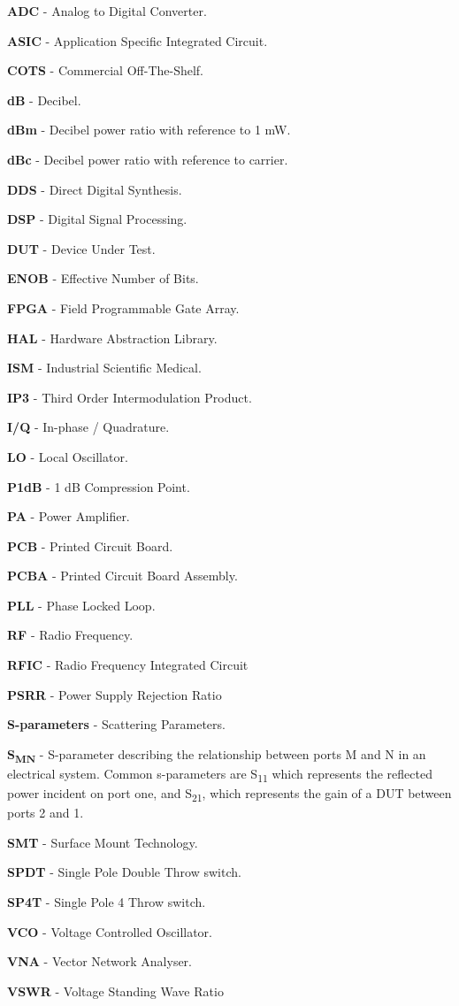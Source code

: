 \textbf{ADC} - Analog to Digital Converter.

\textbf{ASIC} - Application Specific Integrated Circuit.

\textbf{COTS} - Commercial Off-The-Shelf.

\textbf{dB} - Decibel.

\textbf{dBm} - Decibel power ratio with reference to 1 mW.

\textbf{dBc} - Decibel power ratio with reference to carrier.

\textbf{DDS} - Direct Digital Synthesis. 

\textbf{DSP} - Digital Signal Processing.

\textbf{DUT} - Device Under Test. 

\textbf{ENOB} - Effective Number of Bits.

\textbf{FPGA} - Field Programmable Gate Array.

\textbf{HAL} - Hardware Abstraction Library.

\textbf{ISM} - Industrial Scientific Medical.

\textbf{IP3} - Third Order Intermodulation Product.

\textbf{I/Q} - In-phase / Quadrature. 

\textbf{LO} - Local Oscillator. 

\textbf{P1dB} - 1 dB Compression Point. 

\textbf{PA} - Power Amplifier.

\textbf{PCB} - Printed Circuit Board. 

\textbf{PCBA} - Printed Circuit Board Assembly.

\textbf{PLL} - Phase Locked Loop.

\textbf{RF} - Radio Frequency.

\textbf{RFIC} - Radio Frequency Integrated Circuit

\textbf{PSRR} - Power Supply Rejection Ratio

\textbf{S-parameters} - Scattering Parameters.

\textbf{S\textsubscript{MN}} - S-parameter describing the relationship between ports M and N in an electrical system. Common s-parameters are S\textsubscript{11} which represents the reflected power incident on port one, and S\textsubscript{21}, which represents the gain of a DUT between ports 2 and 1. 

\textbf{SMT} - Surface Mount Technology.

\textbf{SPDT} - Single Pole Double Throw switch. 

\textbf{SP4T} - Single Pole 4 Throw switch. 

\textbf{VCO} - Voltage Controlled Oscillator.

\textbf{VNA} - Vector Network Analyser. 

\textbf{VSWR} - Voltage Standing Wave Ratio
